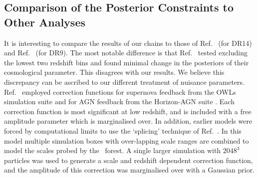 \subsection[Comparison of the Posterior Constraints to Other Lyman-alpha Analyses]{Comparison of the Posterior Constraints to Other \Lya Analyses}
\label{sec:comparison}



It is interesting to compare the results of our chains to those of Ref.~\cite{2020JCAP...04..038P} (for DR14) and Ref.~\cite{2015JCAP...11..011P} (for DR9).
The most notable difference is that Ref.~\cite{2020JCAP...04..038P} tested excluding the lowest two redshift bins and found minimal change in the posteriors of their cosmological parameter.
This disagrees with our results.
We believe this discrepancy can be ascribed to our different treatment of nuisance parameters. Ref.~\cite{2020JCAP...04..038P} employed correction functions for supernova feedback from the OWLs simulation suite \cite{2013MNRAS.429.1734V} and for AGN feedback from the Horizon-AGN suite \cite{2020MNRAS.495.1825C}.
Each correction function is most significant at low redshift, and is included with a free amplitude parameter which is marginalised over.
In addition, earlier models were forced by computational limits to use the `splicing' technique of Ref.~\cite{2014JCAP...07..005B}.
In this model multiple simulation boxes with over-lapping scale ranges are combined to model the scales probed by the \Lya~forest.
A single larger simulation with $2048^3$ particles was used to generate a scale and redshift dependent correction function, and the amplitude of this correction was marginalised over with a Gaussian prior.

